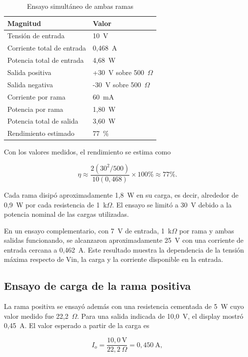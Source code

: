 \documentclass[conference]{IEEEtran}
\begin{document}
\begin{table}[!t]
\caption{Ensayo simultáneo de ambas ramas}
\label{tab:rendimiento}
\centering
\footnotesize
\begin{tabular}{@{}ll@{}}
\toprule
\textbf{Magnitud} & \textbf{Valor} \\
\midrule
Tensión de entrada & 10~V \\
Corriente total de entrada & 0,468~A \\
Potencia total de entrada & 4,68~W \\
Salida positiva & +30~V sobre 500~$\Omega$ \\
Salida negativa & -30~V sobre 500~$\Omega$ \\
Corriente por rama & 60~mA \\
Potencia por rama & 1,80~W \\
Potencia total de salida & 3,60~W \\
Rendimiento estimado & 77~\% \\
\bottomrule
\end{tabular}
\end{table}

Con los valores medidos, el rendimiento se estima como

\begin{equation}
\eta\approx\frac{2(30^2/500)}{10(0,468)}\times100\%\approx77\%.
\end{equation}

Cada rama disipó aproximadamente 1,8~W en su carga, es decir, alrededor de 0,9~W por cada resistencia de 1~k$\Omega$. El ensayo se limitó a 30~V debido a la potencia nominal de las cargas utilizadas.

En un ensayo complementario, con 7~V de entrada, 1~k$\Omega$ por rama y ambas salidas funcionando, se alcanzaron aproximadamente 25~V con una corriente de entrada cercana a 0,462~A. Este resultado muestra la dependencia de la tensión máxima respecto de Vin, la carga y la corriente disponible en la entrada.

\subsection{Ensayo de carga de la rama positiva}

La rama positiva se ensayó además con una resistencia cementada de 5~W cuyo valor medido fue 22,2~$\Omega$. Para una salida indicada de 10,0~V, el display mostró 0,45~A. El valor esperado a partir de la carga es

\begin{equation}
I_o=\frac{10,0\ \mathrm{V}}{22,2\ \Omega}=0,450\ \mathrm{A},
\end{equation}
\end{document}
